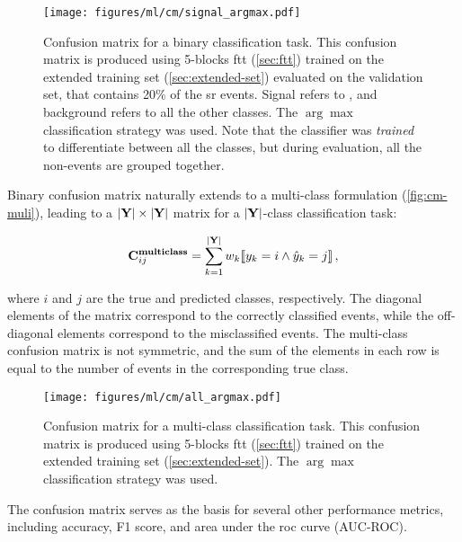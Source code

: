 \begin{figure}[htb]
    \centering
    \texttt{[image: figures/ml/cm/signal\_argmax.pdf]}
    \caption[Confusion matrix for a binary classification task]
    {Confusion matrix for a binary classification task. This confusion matrix is produced using 5-blocks
        \gls{ftt} (\autoref{sec:ftt}) trained on the extended training set (\autoref{sec:extended-set}) evaluated on the
        validation set, that contains 20\% of the \gls{sr} events. Signal refers to \tth, and background refers to all
        the other classes. The $\arg\max$ classification strategy was used.  Note that the classifier was \emph{trained}
        to differentiate between all the classes, but during evaluation, all the non-\tth events are grouped together.}
    \label{fig:cm}
\end{figure}

Binary confusion matrix naturally extends to a multi-class formulation (\autoref{fig:cm-muli}), leading to a
$|\textbf{Y}| \times |\textbf{Y}|$ matrix for a $|\textbf{Y}|$-class classification task:

\begin{equation}
    \mathbf{C}^{\textbf{multiclass}}_{ij} = \sum_{k=1}^{|\textbf{Y}|} w_k \llbracket y_k = i \land \hat{y}_k = j \rrbracket\,,
\end{equation}

where $i$ and $j$ are the true and predicted classes, respectively. The diagonal elements of the matrix correspond to
the correctly classified events, while the off-diagonal elements correspond to the misclassified events. The
multi-class confusion matrix is not symmetric, and the sum of the elements in each row is equal to the number of events
in the corresponding true class.

\begin{figure}[htb]
    \centering
    \texttt{[image: figures/ml/cm/all\_argmax.pdf]}
    \caption[Confusion matrix for a multi-class classification task]
    {Confusion matrix for a multi-class classification task. This confusion matrix is produced using 5-blocks
        \gls{ftt} (\autoref{sec:ftt}) trained on the extended training set (\autoref{sec:extended-set}). The
        $\arg\max$ classification strategy was used.}
    \label{fig:cm-muli}
\end{figure}

The confusion matrix serves as the basis for several other performance metrics, including accuracy, F1 score, and area
under the \gls{roc} curve (AUC-ROC).

